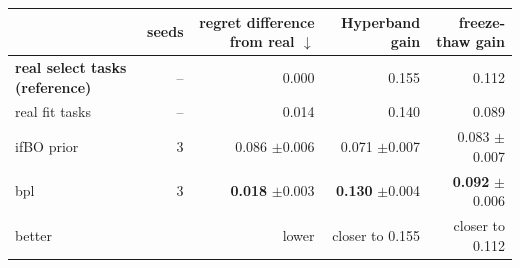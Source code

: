 \begin{tabular}{lrrrr}
\toprule
 & seeds & regret difference from real $\downarrow$ & Hyperband gain & freeze-thaw gain \\
\midrule
\textbf{real select tasks (reference)} & -- & 0.000 & 0.155 & 0.112 \\
real fit tasks & -- & 0.014 & 0.140 & 0.089 \\
\midrule
ifBO prior & 3 & 0.086 {\scriptsize$\pm$0.006} & 0.071 {\scriptsize$\pm$0.007} & 0.083 {\scriptsize$\pm$0.007} \\
bpl & 3 & \textbf{0.018} {\scriptsize$\pm$0.003} & \textbf{0.130} {\scriptsize$\pm$0.004} & \textbf{0.092} {\scriptsize$\pm$0.006} \\
\midrule
better & & lower & closer to 0.155 & closer to 0.112 \\
\bottomrule
\end{tabular}
